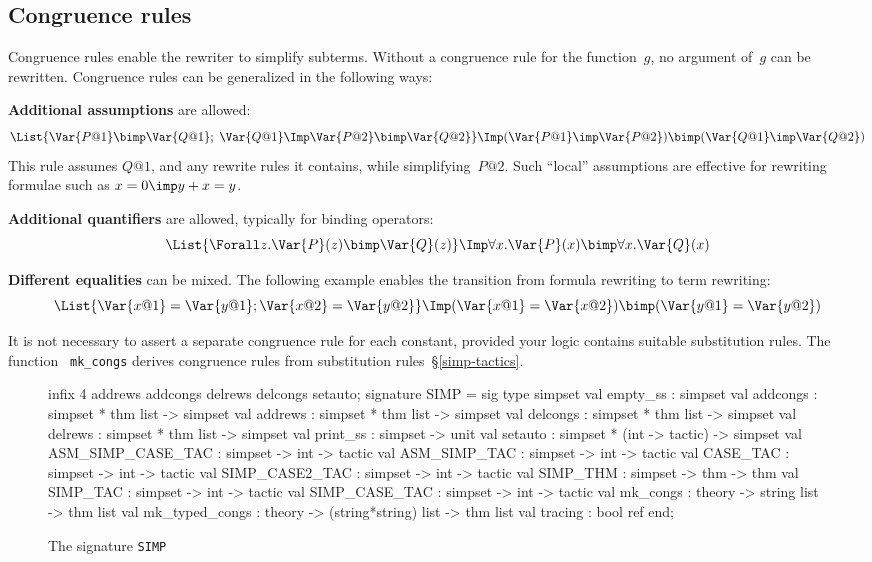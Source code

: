 \subsection{Congruence rules}
Congruence rules enable the rewriter to simplify subterms.  Without a
congruence rule for the function~$g$, no argument of~$g$ can be rewritten.
Congruence rules can be generalized in the following ways:

{\bf Additional assumptions} are allowed:
\[ \List{\Var{P@1} \bimp \Var{Q@1};\; \Var{Q@1} \Imp \Var{P@2} \bimp \Var{Q@2}}
   \Imp (\Var{P@1} \imp \Var{P@2}) \bimp (\Var{Q@1} \imp \Var{Q@2})
\]
This rule assumes $Q@1$, and any rewrite rules it contains, while
simplifying~$P@2$.  Such ``local'' assumptions are effective for rewriting
formulae such as $x=0\imp y+x=y$.

{\bf Additional quantifiers} are allowed, typically for binding operators:
\[ \List{\Forall z. \Var{P}(z) \bimp \Var{Q}(z)} \Imp
   \forall x.\Var{P}(x) \bimp \forall x.\Var{Q}(x)
\]

{\bf Different equalities} can be mixed.  The following example
enables the transition from formula rewriting to term rewriting:
\[ \List{\Var{x@1}=\Var{y@1};\Var{x@2}=\Var{y@2}} \Imp
   (\Var{x@1}=\Var{x@2}) \bimp (\Var{y@1}=\Var{y@2})
\]
\begin{warn}
It is not necessary to assert a separate congruence rule for each constant,
provided your logic contains suitable substitution rules. The function {\tt
mk_congs} derives congruence rules from substitution
rules~\S\ref{simp-tactics}.
\end{warn}


\begin{figure}
\begin{ttbox}
infix 4 addrews addcongs delrews delcongs setauto;
signature SIMP =
sig
  type simpset
  val empty_ss  : simpset
  val addcongs  : simpset * thm list -> simpset
  val addrews   : simpset * thm list -> simpset
  val delcongs  : simpset * thm list -> simpset
  val delrews   : simpset * thm list -> simpset
  val print_ss  : simpset -> unit
  val setauto   : simpset * (int -> tactic) -> simpset
  val ASM_SIMP_CASE_TAC : simpset -> int -> tactic
  val ASM_SIMP_TAC      : simpset -> int -> tactic
  val CASE_TAC          : simpset -> int -> tactic
  val SIMP_CASE2_TAC    : simpset -> int -> tactic
  val SIMP_THM          : simpset -> thm -> thm
  val SIMP_TAC          : simpset -> int -> tactic
  val SIMP_CASE_TAC     : simpset -> int -> tactic
  val mk_congs          : theory -> string list -> thm list
  val mk_typed_congs    : theory -> (string*string) list -> thm list
  val tracing   : bool ref
end;
\end{ttbox}
\caption{The signature {\tt SIMP}} \label{SIMP}
\end{figure}


